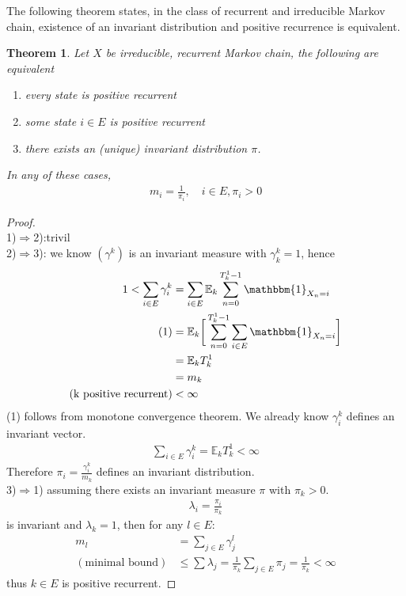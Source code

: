\documentclass[a4paper,11pt]{book}
\newtheorem{theorem}{Theorem}[section]
\theoremstyle{definition}
\theoremstyle{remark}
\begin{document}
The following theorem states, in the class of recurrent and irreducible Markov chain, existence of an invariant distribution and positive recurrence is equivalent.
\begin{theorem}
	Let $X$ be irreducible, recurrent Markov chain, the following are equivalent
	\begin{enumerate}
		\item every state is positive recurrent
		\item some state $i \in E$ is positive recurrent
		\item there exists an (unique) invariant distribution  $\pi$.
	\end{enumerate}
	In any of these cases, 
	\begin{align*}
		m_i = \frac{1}{\pi_i}, \quad i \in E, \pi_i > 0
	\end{align*}
\end{theorem}
\begin{proof}\quad\\
1)$\Rightarrow$2):trivil\\
2)$\Rightarrow$3): we know $(\gamma^k)$ is an invariant measure with $\gamma_k^k = 1$, hence
\begin{align*}
	1 < \sum_{i \in E} \gamma_i^k &= \sum_{i \in E}\mathbb{E}_k \sum_{n = 0}^{T_k^1 -1}\mathbbm{1}_{X_n = i}\\
	(1)
	&= \mathbb{E}_k \bigg[ \sum_{n = 0}^{T_k^1 -1} \sum_{i \in E} \mathbbm{1}_{X_n = i} \bigg]\\
	&= \mathbb{E}_k T_k^1\\
	&= m_k \\
(\text{k positive recurrent})
	&< \infty
\end{align*}
(1) follows from monotone convergence theorem. We already know $\gamma^k_i$ defines an invariant vector.
\begin{align*}
	\sum_{i \in E}\gamma_i^k = \mathbb{E}_k T^1_k < \infty
\end{align*}
Therefore $\pi_i = \frac{\gamma_i^k}{m_k}$ defines an invariant distribution.\\
3)$\Rightarrow$1) assuming there exists an invariant measure $\pi$ with $\pi_k >0$. 
\begin{align*}
	\lambda_i = \frac{\pi_i}{\pi_k}
\end{align*}
is invariant and $\lambda_k = 1$, then for any $l \in E$:
\begin{align*}
	m_l &= \sum_{j \in E} \gamma_j^l \\
	(\text{minimal bound})
	&\le \sum \lambda_j = \frac{1}{\pi_k} \sum_{j \in E} \pi_j = \frac{1}{\pi_k} < \infty
\end{align*}
thus $k \in E$ is positive recurrent.
	
\end{proof}
\end{document}
